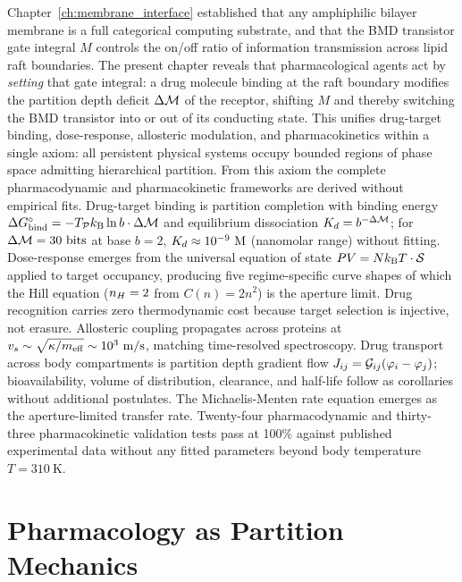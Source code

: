 \begin{chapterabstract}
Chapter~\ref{ch:membrane_interface} established that any amphiphilic bilayer membrane is a full categorical computing substrate, and that the BMD transistor gate integral $M$ controls the on/off ratio of information transmission across lipid raft boundaries. The present chapter reveals that pharmacological agents act by \emph{setting} that gate integral: a drug molecule binding at the raft boundary modifies the partition depth deficit $\Delta\mathcal{M}$ of the receptor, shifting $M$ and thereby switching the BMD transistor into or out of its conducting state. This unifies drug-target binding, dose-response, allosteric modulation, and pharmacokinetics within a single axiom: all persistent physical systems occupy bounded regions of phase space admitting hierarchical partition. From this axiom the complete pharmacodynamic and pharmacokinetic frameworks are derived without empirical fits. Drug-target binding is partition completion with binding energy $\Delta G^\circ_{\mathrm{bind}} = -T_{\mathcal{P}}k_{\mathrm{B}}\ln b\cdot\Delta\mathcal{M}$ and equilibrium dissociation $K_d = b^{-\Delta\mathcal{M}}$; for $\Delta\mathcal{M} = 30\ \mathrm{bits}$ at base $b = 2$, $K_d \approx 10^{-9}\ \mathrm{M}$ (nanomolar range) without fitting. Dose-response emerges from the universal equation of state $PV = Nk_{\mathrm{B}} T\cdot\mathcal{S}$ applied to target occupancy, producing five regime-specific curve shapes of which the Hill equation ($n_H = 2$ from $C(n) = 2n^2$) is the aperture limit. Drug recognition carries zero thermodynamic cost because target selection is injective, not erasure. Allosteric coupling propagates across proteins at $v_s \sim \sqrt{\kappa/m_{\mathrm{eff}}} \sim 10^3\ \mathrm{m/s}$, matching time-resolved spectroscopy. Drug transport across body compartments is partition depth gradient flow $J_{ij} = \mathcal{G}_{ij}(\varphi_i - \varphi_j)$; bioavailability, volume of distribution, clearance, and half-life follow as corollaries without additional postulates. The Michaelis-Menten rate equation emerges as the aperture-limited transfer rate. Twenty-four pharmacodynamic and thirty-three pharmacokinetic validation tests pass at 100\% against published experimental data without any fitted parameters beyond body temperature $T = 310\ \mathrm{K}$.
\end{chapterabstract}

\section{Pharmacology as Partition Mechanics}
\label{sec:ch12_intro}

